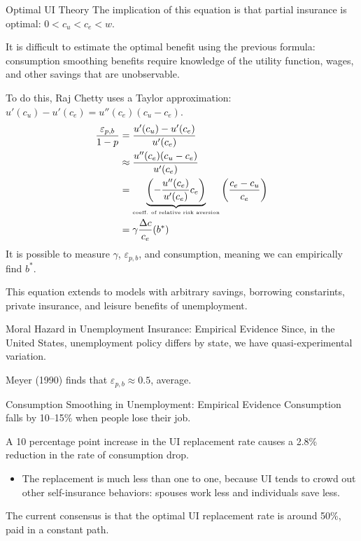\documentclass[8pt]{extarticle}
\begin{document}
\begin{problem}{Optimal UI Theory}
    The implication of this equation is that partial insurance is optimal: $0 < c_u < c_e < w$.\newline

    It is difficult to estimate the optimal benefit using the previous formula: consumption smoothing benefits require knowledge of the utility function, wages, and other savings that are unobservable.\newline

    To do this, Raj Chetty uses a Taylor approximation: $u'(c_u) - u'(c_e) = u''(c_e)(c_u - c_e)$.
    \begin{align*}
      \frac{\varepsilon_{p,b}}{1-p} &= \frac{u'(c_u) - u'(c_e)}{u'(c_e)}\\
                                    &\approx \frac{u''(c_e)(c_u - c_e)}{u'(c_e)}\\
                                    &= \underbrace{\left(-\frac{u''(c_e)}{u'(c_e)}c_e\right)}_{\text{\tiny coeff. of relative risk aversion}}\left(\frac{c_e - c_u}{c_e}\right)\\
                                    &= \gamma \frac{\Delta c}{c_e}(b^*)
    \end{align*}
    It is possible to measure $\gamma$, $\varepsilon_{p,b}$, and consumption, meaning we can empirically find $b^*$.\newline

    This equation extends to models with arbitrary savings, borrowing constarints, private insurance, and leisure benefits of unemployment.
    \begin{problem}{Moral Hazard in Unemployment Insurance: Empirical Evidence}
      Since, in the United States, unemployment policy differs by state, we have quasi-experimental variation.\newline

      Meyer (1990) finds that $\varepsilon_{p,b} \approx 0.5$, average.
    \end{problem}
    \begin{problem}{Consumption Smoothing in Unemployment: Empirical Evidence}
      Consumption falls by 10--15\% when people lose their job.\newline

      A 10 percentage point increase in the UI replacement rate causes a 2.8\% reduction in the rate of consumption drop.
      \begin{itemize}
        \item The replacement is much less than one to one, because UI tends to crowd out other self-insurance behaviors: spouses work less and individuals save less.
      \end{itemize}
    \end{problem}
    The current consensus is that the optimal UI replacement rate is around 50\%, paid in a constant path.
  \end{problem}
\end{document}

